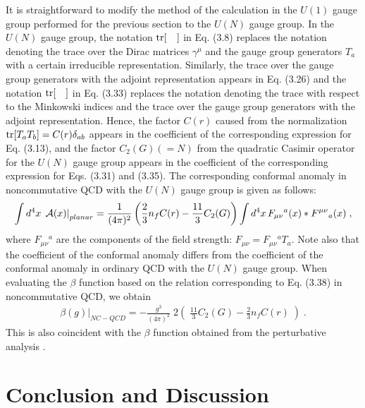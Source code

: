 \documentclass[a4paper,12pt]{article}
\begin{document}
It is straightforward to modify the method of the calculation in the $U(1)$ 
gauge group performed for the previous section to the $U(N)$ gauge group. 
In the $U(N)$ gauge group, the notation ${\rm tr}[ \quad ]$ in Eq. (3.8) 
replaces the notation denoting the trace over the Dirac matrices 
$\gamma^{\mu}$ and the gauge group generators $T_{a}$ with a certain 
irreducible representation. Similarly, the trace over the gauge group 
generators with the adjoint representation appears in Eq. (3.26) and the 
notation ${\rm tr}[ \quad ]$ in Eq. (3.33) replaces the notation 
denoting the trace with respect to the Minkowski indices and the trace over 
the gauge group generators with the adjoint representation. Hence, the 
factor $C(r)$ caused from the normalization ${\rm tr}[T_{a}T_{b}]
=C(r)\delta_{ab}$ appears in the coefficient of the corresponding 
expression for Eq. (3.13), and the factor $C_{2}(G) (= N )$ from the quadratic 
Casimir operator for the $U(N)$ gauge group appears in the coefficient of the 
corresponding expression for Eqs. (3.31) and (3.35). The corresponding 
conformal anomaly in noncommutative QCD with the $U(N)$ gauge group is given 
as follows: 
%
\begin{eqnarray}
\int d^{4}x \, \left. {\cal A}(x) \right|_{planar} 
= \frac{1}{(4\pi)^{2}}  \left( \frac{2}{3}n_{f}C(r) 
- \frac{11}{3}C_{2}(G) \right) 
\int d^{4}x \, F_{\mu\nu}{}^{a}(x) \ast F^{\mu\nu}{}_{a}(x) \;,
\end{eqnarray}
%
where $F_{\mu\nu}{}^{a}$ are the components of the field strength:
$F_{\mu\nu} = F_{\mu\nu}{}^{a}T_{a}$. Note also that the coefficient of 
the conformal anomaly differs from the coefficient of the conformal 
anomaly in ordinary QCD with the $U(N)$ gauge group. When evaluating the 
$\beta$ function based on the relation corresponding to Eq. (3.38) in 
noncommutative QCD, we obtain 
%
%
\begin{eqnarray}
\left. \beta(g) \right|_{NC-QCD} = -\frac{g^{3}}{(4\pi)^{2}} \; 
2\left(\;\frac{11}{3}C_{2}(G) - \frac{2}{3}n_{f}C(r) \;\right) \;.
\end{eqnarray}
%
This is also coincident with the $\beta$ function obtained from the 
perturbative analysis \footnotemark[3] \cite{VVKGT}. 
%
%

%
%
\section{Conclusion and Discussion}
\setcounter{equation}{0}
\addtocounter{enumi}{1}
%
\end{document}
